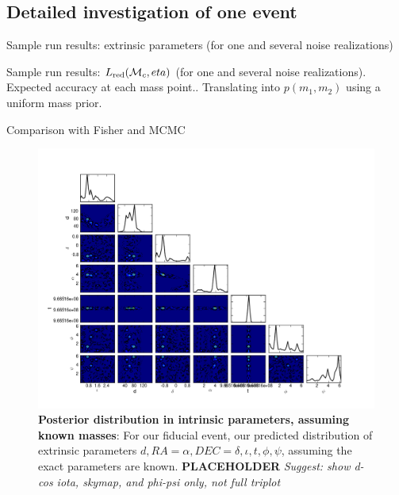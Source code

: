 \documentclass[twocolumn,prd,nofootinbib]{revtex4}
\newcommand\mc{{{\cal M}_c}}
\begin{document}
\subsection{Detailed investigation of one event}

Sample run results: extrinsic parameters (for one and several noise realizations)

Sample run results: $L_{\rm red}(\mc,eta)$ (for one and several noise realizations). Expected accuracy at each mass
point.. Translating into  $p(m_1,m_2)$ using a uniform mass prior.

Comparison with Fisher and MCMC



\begin{figure}
\includegraphics[width=\textwidth]{../Figures/ILE_MASS_SET_0-triplot}
\caption{\textbf{Posterior distribution in intrinsic parameters, assuming known masses}: For our fiducial event, our predicted
  distribution of extrinsic parameters $d,RA=\alpha,DEC=\delta,\iota,t,\phi,\psi$, assuming the exact parameters are
  known.    \textbf{PLACEHOLDER} \emph{Suggest: show d-cos iota, skymap, and phi-psi only, not full triplot}
}
\end{figure}
\end{document}
